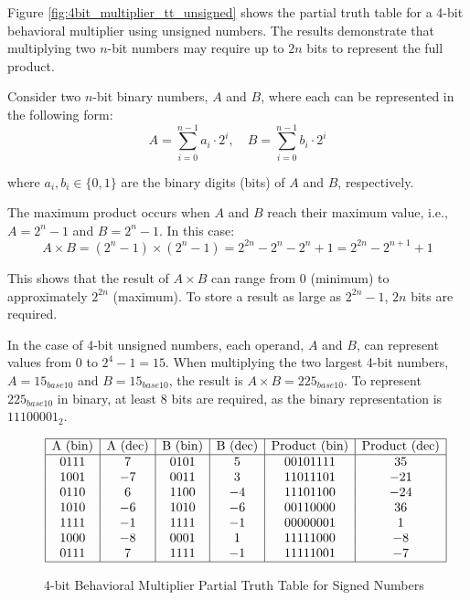 Figure \ref{fig:4bit_multiplier_tt_unsigned} shows the partial truth table for a 4-bit behavioral multiplier using unsigned numbers. The results demonstrate that multiplying two $n$-bit numbers may require up to $2n$ bits to represent the full product.

Consider two $n$-bit binary numbers, $A$ and $B$, where each can be represented in the following form:
\[
A = \sum_{i=0}^{n-1} a_i \cdot 2^i, \quad B = \sum_{i=0}^{n-1} b_i \cdot 2^i
\]

where $a_i, b_i \in \{0, 1\}$ are the binary digits (bits) of $A$ and $B$, respectively.

The maximum product occurs when $A$ and $B$ reach their maximum value, i.e., $A = 2^n - 1$ and $B = 2^n - 1$. In this case:
\[
A \times B = (2^n - 1) \times (2^n - 1) = 2^{2n} - 2^n - 2^n + 1 = 2^{2n} - 2^{n+1} + 1
\]

This shows that the result of $A \times B$ can range from $0$ (minimum) to approximately $2^{2n}$ (maximum). To store a result as large as $2^{2n} - 1$, $2n$ bits are required.

In the case of 4-bit unsigned numbers, each operand, $A$ and $B$, can represent values from $0$ to $2^4 - 1 = 15$. When multiplying the two largest 4-bit numbers, $A = 15_{base10}$ and $B = 15_{base10}$, the result is $A \times B = 225_{base10}$. To represent $225_{base10}$ in binary, at least 8 bits are required, as the binary representation is $11100001_2$.

\begin{figure}[H]
    \centering
\[
\begin{array}{|c|c|c|c|c|c|}
\hline
\text{A (bin)} & \text{A (dec)} & \text{B (bin)} & \text{B (dec)} & \text{Product (bin)} & \text{Product (dec)} \\
\hline
0111 & 7 & 0101 & 5 & 00101111 & 35 \\
1001 & -7 & 0011 & 3 & 11011101 & -21 \\
0110 & 6 & 1100 & -4 & 11101100 & -24 \\
1010 & -6 & 1010 & -6 & 00110000 & 36 \\
1111 & -1 & 1111 & -1 & 00000001 & 1 \\
1000 & -8 & 0001 & 1 & 11111000 & -8 \\
0111 & 7 & 1111 & -1 & 11111001 & -7 \\
\hline
\end{array}
\]
    \caption{4-bit Behavioral Multiplier Partial Truth Table for Signed Numbers}
    \label{fig:4bit_multiplier_tt_signed}
\end{figure}

